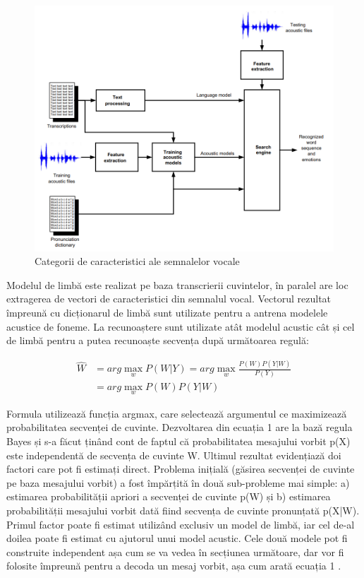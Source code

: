 \documentclass[9pt,shortpaper,twoside,web]{ieeecolor}
\begin{document}
\begin{figure}[htb]
\includegraphics[width=\columnwidth]{res/fig/arhitectura_modelL_modelA}
\caption{Categorii de caracteristici ale semnalelor vocale}
\label{fig2}
\end{figure}

Modelul de limbă este realizat pe baza transcrierii cuvintelor, în paralel are loc extragerea de vectori de caracteristici din semnalul vocal. Vectorul rezultat împreună cu dicționarul de limbă sunt utilizate pentru a antrena modelele acustice de foneme. La recunoaștere sunt utilizate atât modelul acustic cât și cel de limbă pentru a putea recunoaște secvența după următoarea regulă:

\begin{equation} \label{eq1}
\begin{split}
\hat{W} & =arg \max_{{w}} P(W|Y) = arg \max_{{w}} \frac{P(W)P(Y|W)}{P(Y)} \\
 & =  arg \max_{{w}} P(W)P(Y|W)
\end{split}
\end{equation}

Formula utilizează funcția argmax, care selectează argumentul ce maximizează probabilitatea secvenței de cuvinte. Dezvoltarea din ecuația 1 are la bază regula Bayes și s-a făcut ținând cont de faptul că probabilitatea mesajului vorbit p(X) este independentă de secvența de cuvinte W. Ultimul rezultat evidențiază doi factori care pot fi estimați direct. Problema inițială (găsirea secvenței de cuvinte pe baza mesajului vorbit) a fost împărțită în două sub-probleme mai simple: a) estimarea probabilității apriori a secvenței de cuvinte p(W) și b) estimarea probabilității mesajului vorbit dată fiind secvența de cuvinte pronunțată p(X|W). Primul factor poate fi estimat utilizând exclusiv un model de limbă, iar cel de-al doilea poate fi estimat cu ajutorul unui model acustic. Cele două modele pot fi construite independent așa cum se va vedea în secțiunea următoare, dar vor fi folosite împreună pentru a decoda un mesaj vorbit, așa cum arată ecuația 1 \cite{b3}.
\end{document}

